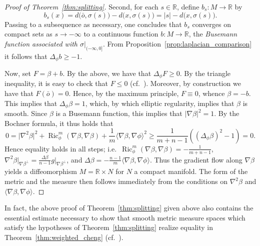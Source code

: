 \documentclass{amsart}
\theoremstyle{definition}
\theoremstyle{remark}
\numberwithin{equation}{section}
\begin{document}
\begin{proof}[Proof of Theorem~\ref{thm:splitting}]
Second, for each $s\in{\mathbb{R}}$, define $b_s\colon M\to{\mathbb{R}}$ by
\[ b_s(x) = d\big(\bar o,\sigma(s)\big) - d\big(x,\sigma(s)\big) = {\lvert} s{\rvert} - d\big(x,\sigma(s)\big) . \]
Passing to a subsequence as necessary, one concludes that $b_s$ converges on compact sets as $s\to-\infty$ to a continuous function $b\colon M\to{\mathbb{R}}$, the \emph{Busemann function associated with $\sigma{\rvert}_{(-\infty,0]}$}.  From Proposition~\ref{prop:laplacian_comparison} it follows that $\Delta_\phi b\geq-1$.

Now, set $F=\beta+b$.  By the above, we have that $\Delta_\phi F\geq 0$.  By the triangle inequality, it is easy to check that $F\leq 0$ (cf.\ \cite{CaiGalloway1999}).  Moreover, by construction we have that $F(\bar o)=0$.  Hence, by the maximum principle, $F\equiv 0$, whence $\beta=-b$.  This implies that $\Delta_\phi\beta=1$, which, by which elliptic regularity, implies that $\beta$ is smooth.  Since $\beta$ is a Busemann function, this implies that ${\lvert}\nabla\beta{\rvert}^2=1$.  By the Bochner formula, it thus holds that
\[ 0 = {\lvert}\nabla^2\beta{\rvert}^2 + \operatorname{Ric}_\phi^m(\nabla\beta,\nabla\beta) + \frac{1}{m}{\langle}\nabla\beta,\nabla\phi{\rangle}^2 \geq \frac{1}{m+n-1}\left((\Delta_\phi\beta)^2-1\right) = 0 . \]
Hence equality holds in all steps; i.e.\ $\operatorname{Ric}_\phi^m(\nabla\beta,\nabla\beta)=-\frac{1}{m+n-1}$, $\nabla^2\beta\big|_{\nabla\beta^\perp}=\frac{\Delta\beta}{n-1}g\big|_{\nabla\beta^\perp}$, and $\Delta\beta=-\frac{n-1}{m}{\langle}\nabla\beta,\nabla\phi{\rangle}$.  Thus the gradient flow along $\nabla\beta$ yields a diffeomorphism $M={\mathbb{R}}\times N$ for $N$ a compact manifold.  The form of the metric and the measure then follows immediately from the conditions on $\nabla^2\beta$ and ${\langle}\nabla\beta,\nabla\phi{\rangle}$.
\end{proof}

In fact, the above proof of Theorem~\ref{thm:splitting} given above also contains the essential estimate necessary to show that smooth metric measure spaces which satisfy the hypotheses of Theorem~\ref{thm:splitting} realize equality in Theorem~\ref{thm:weighted_cheng} (cf.\ \cite{Wang2001a}).
\end{document}
